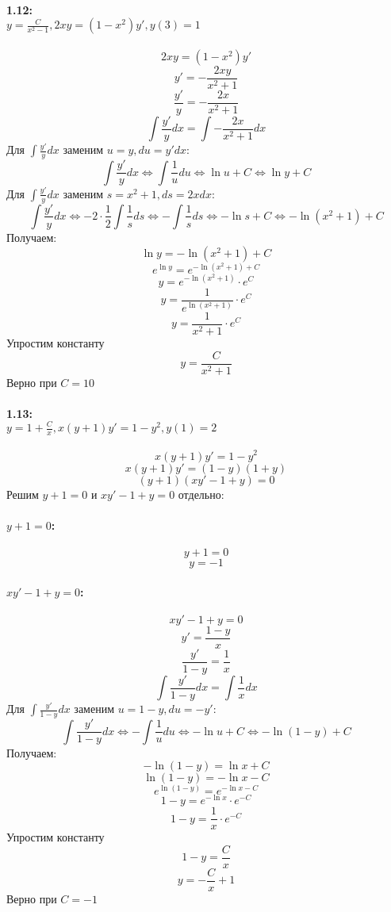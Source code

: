 \paragraph{1.12:\\ $y = \frac{C}{x^2 - 1}, 2xy = (1 - x^2)y', y(3) = 1$}
\[2xy = (1 - x^2)y'\]
\[y' = -\frac{2xy}{x^2 + 1}\]
\[\frac{y'}{y} = -\frac{2x}{x^2 + 1}\]
\[\int\frac{y'}{y}dx = \int-\frac{2x}{x^2 + 1}dx\]
Для $\int\frac{y'}{y}dx$ заменим $u = y, du = y'dx$:
\[
  \int\frac{y'}{y}dx
  \Leftrightarrow \int\frac{1}{u}du
  \Leftrightarrow \ln u + C
  \Leftrightarrow \ln y + C
\]
Для $\int\frac{y'}{y}dx$ заменим $s = x^2 + 1, ds = 2xdx$:
\[
  \int\frac{y'}{y}dx
  \Leftrightarrow -2 \cdot \frac{1}{2}\int\frac{1}{s}ds
  \Leftrightarrow -\int\frac{1}{s}ds
  \Leftrightarrow -\ln s + C
  \Leftrightarrow -\ln(x^2 + 1) + C
\]
Получаем:
\[\ln y = -\ln(x^2 + 1) + C\]
\[e^{\ln y} = e^{-\ln(x^2 + 1) + C}\]
\[y = e^{-\ln(x^2 + 1)} \cdot e^C\]
\[y = \frac{1}{e^{\ln(x^2 + 1)}} \cdot e^C\]
\[y = \frac{1}{x^2 + 1} \cdot e^C\]
Упростим константу
\[y = \frac{C}{x^2 + 1}\]
Верно при $C = 10$

\paragraph{1.13:\\ $y = 1 + \frac{C}{x}, x(y + 1)y' = 1 - y^2, y(1) = 2$}
\[x(y + 1)y' = 1 - y^2\]
\[x(y + 1)y' = (1 - y)(1 + y)\]
\[(y + 1)(xy' - 1 + y) = 0\]
Решим $y + 1 = 0$ и $xy' - 1 + y = 0$ отдельно:

\paragraph{$y + 1 = 0$:}
\[y + 1 = 0\]
\[y = -1\]

\paragraph{$xy' - 1 + y = 0$:}
\[xy' - 1 + y = 0\]
\[y' = \frac{1 - y}{x}\]
\[\frac{y'}{1 - y} = \frac{1}{x}\]
\[\int\frac{y'}{1 - y}dx = \int\frac{1}{x}dx\]
Для $\int\frac{y'}{1 - y}dx$ заменим $u = 1 - y, du = -y'$:
\[
  \int\frac{y'}{1 - y}dx
  \Leftrightarrow -\int\frac{1}{u}du
  \Leftrightarrow -\ln u + C
  \Leftrightarrow -\ln(1 - y) + C
\]
Получаем:
\[-\ln(1 - y) = \ln x + C\]
\[\ln(1 - y) = -\ln x - C\]
\[e^{\ln(1 - y)} = e^{-\ln x - C}\]
\[1 - y = e^{-\ln x} \cdot e^{-C}\]
\[1 - y = \frac{1}{x} \cdot e^{-C}\]
Упростим константу
\[1 - y = \frac{C}{x} \]
\[y = -\frac{C}{x} + 1\]
Верно при $C = -1$

